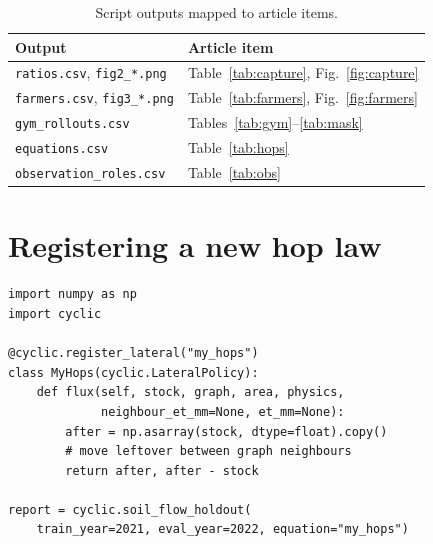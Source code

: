 \documentclass[preprint,12pt,authoryear,review]{elsarticle}
\begin{document}
\begin{table}[htbp]
\centering
\small
\caption{Script outputs mapped to article items.}
\begin{tabular}{ll}
\toprule
Output & Article item \\
\midrule
\texttt{ratios.csv}, \texttt{fig2\_*.png} & Table~\ref{tab:capture}, Fig.~\ref{fig:capture} \\
\texttt{farmers.csv}, \texttt{fig3\_*.png} & Table~\ref{tab:farmers}, Fig.~\ref{fig:farmers} \\
\texttt{gym\_rollouts.csv} & Tables~\ref{tab:gym}--\ref{tab:mask} \\
\texttt{equations.csv} & Table~\ref{tab:hops} \\
\texttt{observation\_roles.csv} & Table~\ref{tab:obs} \\
\bottomrule
\end{tabular}
\end{table}

\section{Registering a new hop law}
\label{app:register}

\begin{lstlisting}
import numpy as np
import cyclic

@cyclic.register_lateral("my_hops")
class MyHops(cyclic.LateralPolicy):
    def flux(self, stock, graph, area, physics,
             neighbour_et_mm=None, et_mm=None):
        after = np.asarray(stock, dtype=float).copy()
        # move leftover between graph neighbours
        return after, after - stock

report = cyclic.soil_flow_holdout(
    train_year=2021, eval_year=2022, equation="my_hops")
\end{lstlisting}
\end{document}
